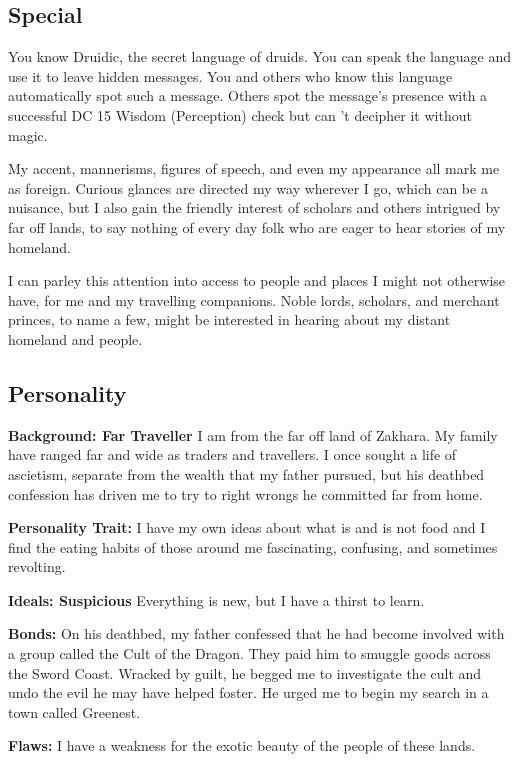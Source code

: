 \documentclass[letterpaper,10pt,twoside,twocolumn,openany]{book}
\begin{document}
\subsection{Special}
\begin{specialability}[Druidic]
  You know Druidic, the secret language of druids. You can speak the language and use it to leave hidden messages. You and others who know this language automatically spot such a message. Others spot the message’s presence with a successful DC 15 Wisdom (Perception) check but can ’t decipher it without magic.
\end{specialability}

\begin{specialability}
  My accent, mannerisms, figures of speech, and even my appearance all mark me as foreign. Curious glances are directed my way wherever I go, which can be a nuisance, but I also gain the friendly interest of scholars and others intrigued by far off lands, to say nothing of every day folk who are eager to hear stories of my homeland.

  I can parley this attention into access to people and places I might not otherwise have, for me and my travelling companions. Noble lords, scholars, and merchant princes, to name a few, might be interested in hearing about my distant homeland and people.
\end{specialability}

\subsection{Personality}

\textbf{Background: Far Traveller} I am from the far off land of Zakhara. My family have ranged far and wide as traders and travellers. I once sought a life of ascietism, separate from the wealth that my father pursued, but his deathbed confession has driven me to try to right wrongs he committed far from home.

\textbf{Personality Trait:} I have my own ideas about what is and is not food and I find the eating habits of those around me fascinating, confusing, and sometimes revolting.

\textbf{Ideals: Suspicious} Everything is new, but I have a thirst to learn.

\textbf{Bonds:} On his deathbed, my father confessed that he had become involved with a group called the Cult of the Dragon. They paid him to smuggle goods across the Sword Coast. Wracked by guilt, he begged me to investigate the cult and undo the evil he may have helped foster. He urged me to begin my search in a town called Greenest.

\textbf{Flaws:} I have a weakness for the exotic beauty of the people of these lands.
\end{document}
